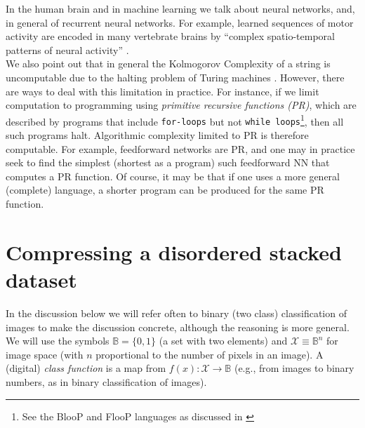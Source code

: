 \documentclass[11pt]{amsart}
\newcommand{\inputspace}{\mathcal X}
\begin{document}
In the human brain and in machine learning we talk about neural networks, and, in general of recurrent neural networks.  For example,  learned sequences of motor activity are encoded in many vertebrate
brains by ``complex spatio-temporal patterns of neural activity'' \cite{Hahnloser:2002aa}. %
%
% 
\\

We also point out that in general the Kolmogorov Complexity of a string is uncomputable due to the halting problem of Turing machines \cite{Cover:2006aa}. However, there are ways to deal with this limitation in practice. For instance, if we limit computation to programming using  {\em primitive recursive functions (PR)}, which are described by programs that include {\tt for-loops} but not {\tt while loops}\footnote{See the BlooP and FlooP languages as discussed in \cite{Hofstadter:1979aa}}, then all such programs halt. Algorithmic complexity limited to PR is therefore computable. For example, feedforward networks  are PR, and one may in practice seek to find the simplest (shortest as a program) such feedforward NN that computes a PR function.  Of course, it may be that if one uses a more general (complete) language, a shorter program can be produced for the same PR function. 

\section{Compressing a disordered stacked dataset}
In the discussion below we will refer often to  binary (two class) classification of images to make the discussion concrete, although the reasoning is more general.  We will use the symbols $\mathbb B=\{0,1\}$  (a set with two elements) and   $\inputspace \equiv \mathbb B^{n} $ for image space (with $n$ proportional to the number of pixels in an image).   A (digital) {\em class function} is a map from $f(x): \inputspace  \rightarrow \mathbb B$ (e.g., from images to binary numbers, as in binary classification of images).   \\
\end{document}
